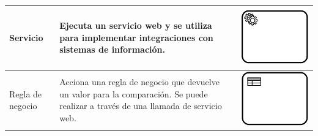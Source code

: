\begin{table}[H]
\begin{tabular}{|p{2cm}|p{9.5cm}|p{1.7cm} |}
	\hline
	{\small Servicio } & {\small Ejecuta un servicio web y se utiliza para implementar integraciones con sistemas de información.} & \vspace{0.5mm} \hspace{2mm} \includegraphics[scale=0.1]{Capitulo2/imagenes/TServicio} \\
		
	\hline
	{\small Regla de negocio } & {\small Acciona una regla de negocio que devuelve un valor para la comparación. Se puede realizar a través de una llamada de servicio web.} & \vspace{0.5mm} \hspace{2mm} \includegraphics[scale=0.1]{Capitulo2/imagenes/TRNegocio} \\
		\hline
		

\end{tabular}
\end{table}
